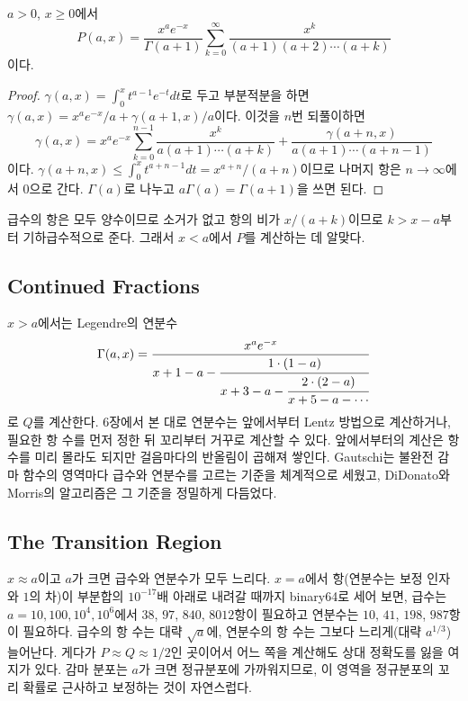 \begin{proposition}
\label{prop:igamma-series}
$a>0$, $x\ge0$에서
\[
P(a,x)=\frac{x^ae^{-x}}{\Gamma(a+1)}\sum_{k=0}^\infty\frac{x^k}{(a+1)(a+2)\cdots(a+k)}
\]
이다.
\end{proposition}

\begin{proof}
$\gamma(a,x)=\int_0^xt^{a-1}e^{-t}dt$로 두고 부분적분을 하면 $\gamma(a,x)=x^ae^{-x}/a+\gamma(a+1,x)/a$이다. 이것을 $n$번 되풀이하면
\[
\gamma(a,x)=x^ae^{-x}\sum_{k=0}^{n-1}\frac{x^k}{a(a+1)\cdots(a+k)}+\frac{\gamma(a+n,x)}{a(a+1)\cdots(a+n-1)}
\]
이다. $\gamma(a+n,x)\le\int_0^xt^{a+n-1}dt=x^{a+n}/(a+n)$이므로 나머지 항은 $n\to\infty$에서 $0$으로 간다. $\Gamma(a)$로 나누고 $a\Gamma(a)=\Gamma(a+1)$을 쓰면 된다.
\end{proof}

급수의 항은 모두 양수이므로 소거가 없고 항의 비가 $x/(a+k)$이므로 $k>x-a$부터 기하급수적으로 준다. 그래서 $x<a$에서 $P$를 계산하는 데 알맞다.

\subsection{Continued Fractions}

$x>a$에서는 Legendre의 연분수
\[
\Gamma(a,x)=\frac{x^ae^{-x}}{x+1-a-\cfrac{1\cdot(1-a)}{x+3-a-\cfrac{2\cdot(2-a)}{x+5-a-\cdots}}}
\]
로 $Q$를 계산한다\cite{dlmf,cuyt2008cf}. 6장에서 본 대로 연분수는 앞에서부터 Lentz 방법으로 계산하거나, 필요한 항 수를 먼저 정한 뒤 꼬리부터 거꾸로 계산할 수 있다. 앞에서부터의 계산은 항 수를 미리 몰라도 되지만 걸음마다의 반올림이 곱해져 쌓인다. Gautschi는 불완전 감마 함수의 영역마다 급수와 연분수를 고르는 기준을 체계적으로 세웠고\cite{gautschi1979igamma}, DiDonato와 Morris의 알고리즘은 그 기준을 정밀하게 다듬었다\cite{didonato1986}.

\subsection{The Transition Region}

$x\approx a$이고 $a$가 크면 급수와 연분수가 모두 느리다. $x=a$에서 항(연분수는 보정 인자와 $1$의 차)이 부분합의 $10^{-17}$배 아래로 내려갈 때까지 binary64로 세어 보면, 급수는 $a=10,100,10^4,10^6$에서 $38$, $97$, $840$, $8012$항이 필요하고 연분수는 $10$, $41$, $198$, $987$항이 필요하다. 급수의 항 수는 대략 $\sqrt a$에, 연분수의 항 수는 그보다 느리게(대략 $a^{1/3}$) 늘어난다. 게다가 $P\approx Q\approx1/2$인 곳이어서 어느 쪽을 계산해도 상대 정확도를 잃을 여지가 있다. 감마 분포는 $a$가 크면 정규분포에 가까워지므로, 이 영역을 정규분포의 꼬리 확률로 근사하고 보정하는 것이 자연스럽다.

